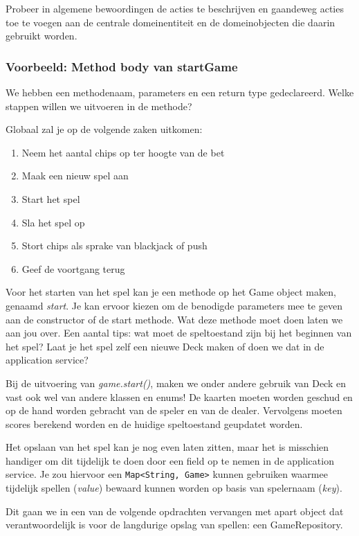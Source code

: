 Probeer in algemene bewoordingen de acties te beschrijven 
en gaandeweg acties toe te voegen aan de centrale domeinentiteit
en de domeinobjecten die daarin gebruikt worden.

\subsubsection{Voorbeeld: Method body van startGame}
We hebben een methodenaam, parameters en een return type gedeclareerd.
Welke stappen willen we uitvoeren in de methode? 

Globaal zal je op de volgende zaken uitkomen:

\begin{enumerate}
    \item Neem het aantal chips op ter hoogte van de bet
    \item Maak een nieuw spel aan
    \item Start het spel
    \item Sla het spel op
    \item Stort chips als sprake van blackjack of push
    \item Geef de voortgang terug
\end{enumerate}

Voor het starten van het spel kan je een methode op het Game object maken,
genaamd \textit{start}. Je kan ervoor kiezen om de benodigde parameters mee te geven aan de 
constructor of de start methode. Wat deze methode moet doen laten we aan jou over.
Een aantal tips: wat moet de speltoestand zijn bij het beginnen van het spel?
Laat je het spel zelf een nieuwe Deck maken of doen we dat in de application service?

Bij de uitvoering van \textit{game.start()}, maken we onder andere gebruik van 
Deck en vast ook wel van andere klassen en enums! 
De kaarten moeten worden geschud en op de hand worden gebracht van de speler 
en van de dealer. Vervolgens moeten scores berekend worden en de huidige speltoestand 
geupdatet worden.

Het opslaan van het spel kan je nog even laten zitten,
maar het is misschien handiger om dit tijdelijk te doen 
door een field op te nemen in de application service.
Je zou hiervoor een \texttt{Map<String, Game>} kunnen gebruiken 
waarmee tijdelijk spellen (\textit{value}) bewaard kunnen worden 
op basis van spelernaam (\textit{key}).

Dit gaan we in een van de volgende opdrachten vervangen met apart object dat verantwoordelijk 
is voor de langdurige opslag van spellen: een GameRepository.


